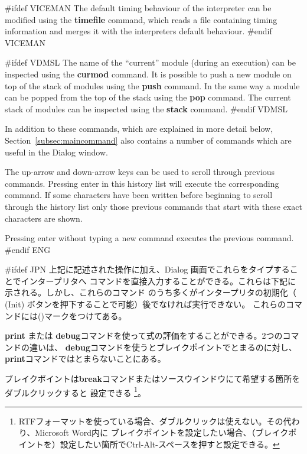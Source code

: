 \documentclass[\pformat,12pt]{article}
\newcommand{\guicmd}[1]{{\sf #1}}
\newcommand{\guicmd}[1]{{\gt #1}}
\begin{document}
#ifdef VICEMAN
The default timing behaviour of the interpreter can be modified using
the \textbf{timefile} command, which reads a file containing timing
information and merges it with the interpreters default behaviour.
#endif VICEMAN

#ifdef VDMSL
The name of the ``current'' module (during an execution) can be
inspected using the \textbf{curmod} command. It is possible to push a 
new module on top of the stack of modules using the \textbf{push}
command. In the same way a module can be popped from the top of the
stack using the \textbf{pop} command. The current stack of modules can
be inspected using the \textbf{stack} command.
#endif VDMSL

In addition to these commands, which are explained in more detail below,
Section~\ref{subsec:maincommand} also contains a number of commands
which are useful in the \guicmd{Dialog} window.

The up-arrow and down-arrow keys can be used to scroll through
previous commands. Pressing enter in this history list will execute
the corresponding command.  If some characters have been written
before beginning to scroll through the history list only those
previous commands that start with these exact characters are shown.

Pressing enter without typing a new command executes the previous
command.
#endif ENG

#ifdef JPN
上記に記述された操作に加え、\guicmd{Dialog} 画面でこれらをタイプすることでインタープリタへ
コマンドを直接入力することができる。これらは下記に示される。しかし、これらのコマンド
のうち多くがインタープリタの初期化（
(\guicmd{Init}) ボタンを押下することで可能）後でなければ実行できない。
これらのコマンドには({\tt *})マークをつけてある。

\textbf{print} または
\textbf{debug}コマンドを使って式の評価をすることができる。2つのコマンドの違いは、
{\bf debug}コマンドを使うとブレイクポイントでとまるのに対し、{\bf print}コマンドではとまらないことにある。

ブレイクポイントは\textbf{break}コマンドまたは\guicmd{ソース}ウインドウにて希望する箇所をダブルクリックすると
設定できる \footnote{RTFフォーマットを使っている場合、ダブルクリックは使えない。その代わり、Microsoft Word内に
ブレイクポイントを設定したい場合、（ブレイクポイントを）設定したい箇所でCtrl-Alt-スペースを押すと設定できる。}。
\end{document}
